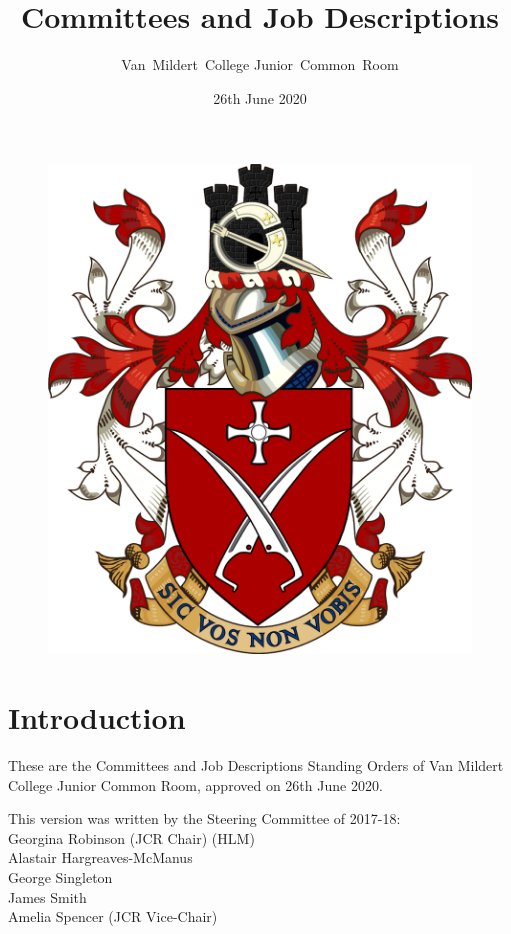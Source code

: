 \documentclass[12pt]{article}
\title{Committees and Job Descriptions}
\author{Van~Mildert~College Junior~Common~Room}
\date{26th June 2020}
\begin{document}
\begin{titlepage}  %
    \maketitle
    \begin{figure}[h]
    \includegraphics[scale=0.25]{arms}  %
    \centering
    \end{figure}
    \thispagestyle{empty}
\end{titlepage}

\setcounter{page}{2}  %
\section*{Introduction}
These are the Committees and Job Descriptions Standing Orders of Van Mildert College Junior Common Room, approved on 26th June 2020.

This version was written by the Steering Committee of 2017-18:\\
\hspace*{2cm}Georgina Robinson (JCR Chair) (HLM)\\
\hspace*{2cm}Alastair Hargreaves-McManus\\
\hspace*{2cm}George Singleton\\
\hspace*{2cm}James Smith\\
\hspace*{2cm}Amelia Spencer (JCR Vice-Chair)
\end{document}
